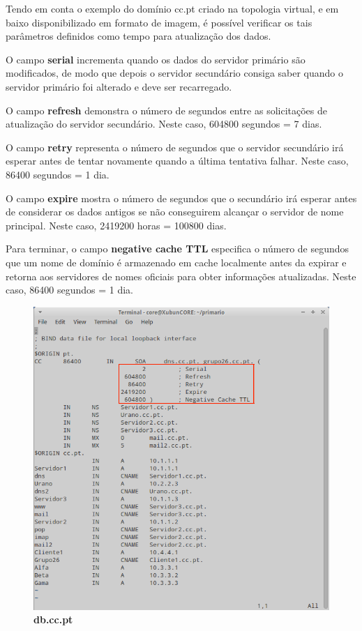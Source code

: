 \documentclass{llncs}
\begin{document}
Tendo em conta o exemplo do domínio cc.pt criado na topologia virtual, e em baixo disponibilizado em formato de imagem, é possível verificar os tais parâmetros definidos como tempo para atualização dos dados.

O campo \textbf{serial} incrementa quando os dados do servidor primário são modificados, de modo que depois o servidor secundário consiga saber quando o servidor primário foi alterado e deve ser recarregado.

O campo \textbf{refresh} demonstra o número de segundos entre as solicitações de atualização do servidor secundário. Neste caso, 604800 segundos = 7 dias.

O campo \textbf{retry} representa o número de segundos que o servidor secundário irá esperar antes de tentar novamente quando a última tentativa falhar. Neste caso, 86400 segundos = 1 dia.

O campo \textbf{expire} mostra o número de segundos que o secundário irá esperar antes de considerar os dados antigos se não conseguirem alcançar o servidor de nome principal. Neste caso, 2419200 horas = 100800 dias.

Para terminar, o campo \textbf{negative cache TTL} especifica o número de segundos que um nome de domínio é armazenado em cache localmente antes da expirar e retorna aos servidores de nomes oficiais para obter informações atualizadas. Neste caso, 86400 segundos = 1 dia.

\begin{figure}[H]
\begin{center}
\includegraphics[scale=0.6]{10.png}
\end{center}
\caption{\label{fig:10}\textbf{db.cc.pt}}
\end{figure}
\end{document}
